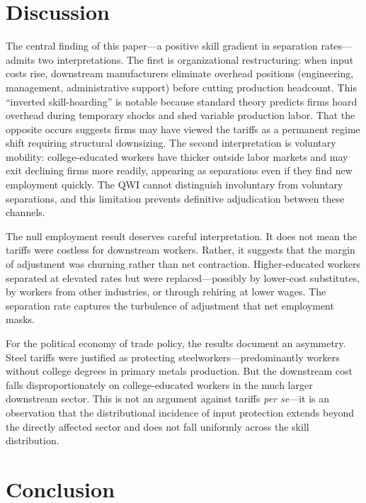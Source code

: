 \documentclass[12pt]{article}
\begin{document}


\section{Discussion}

The central finding of this paper---a positive skill gradient in separation rates---admits two interpretations. The first is organizational restructuring: when input costs rise, downstream manufacturers eliminate overhead positions (engineering, management, administrative support) before cutting production headcount. This ``inverted skill-hoarding'' is notable because standard theory predicts firms hoard overhead during temporary shocks and shed variable production labor. That the opposite occurs suggests firms may have viewed the tariffs as a permanent regime shift requiring structural downsizing. The second interpretation is voluntary mobility: college-educated workers have thicker outside labor markets and may exit declining firms more readily, appearing as separations even if they find new employment quickly. The QWI cannot distinguish involuntary from voluntary separations, and this limitation prevents definitive adjudication between these channels.

The null employment result deserves careful interpretation. It does not mean the tariffs were costless for downstream workers. Rather, it suggests that the margin of adjustment was churning rather than net contraction. Higher-educated workers separated at elevated rates but were replaced---possibly by lower-cost substitutes, by workers from other industries, or through rehiring at lower wages. The separation rate captures the turbulence of adjustment that net employment masks.

For the political economy of trade policy, the results document an asymmetry. Steel tariffs were justified as protecting steelworkers---predominantly workers without college degrees in primary metals production. But the downstream cost falls disproportionately on college-educated workers in the much larger downstream sector. This is not an argument against tariffs \emph{per se}---it is an observation that the distributional incidence of input protection extends beyond the directly affected sector and does not fall uniformly across the skill distribution.

\section{Conclusion}
\end{document}
